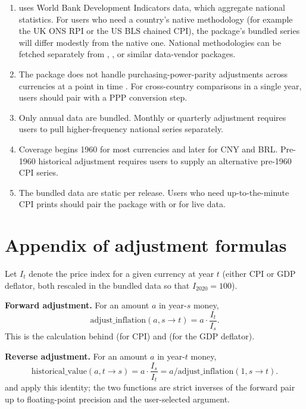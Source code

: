 \begin{enumerate}
\def\labelenumi{\arabic{enumi}.}
\tightlist
\item
   uses World Bank Development Indicators data,
  which aggregate national statistics. For users who need a
  country's native methodology (for example the UK ONS RPI or
  the US BLS chained CPI), the package's bundled series will
  differ modestly from the native one. National methodologies
  can be fetched separately from , ,
  or similar data-vendor packages.
\item
  The package does not handle purchasing-power-parity
  adjustments across currencies at a point in time
  \citep{deaton2010price}. For cross-country comparisons in a single
  year, users should pair  with a PPP
  conversion step.
\item
  Only annual data are bundled. Monthly or quarterly adjustment
  requires users to pull higher-frequency national series
  separately.
\item
  Coverage begins 1960 for most currencies and later for CNY
  and BRL. Pre-1960 historical adjustment requires users to
  supply an alternative pre-1960 CPI series.
\item
  The bundled data are static per release. Users who need
  up-to-the-minute CPI prints should pair the package with
   or  for live data.
\end{enumerate}

\section{Appendix of adjustment formulas}\label{appendix-of-adjustment-formulas}

Let \(I_t\) denote the price index for a given currency at year \(t\)
(either CPI or GDP deflator, both rescaled in the bundled data so
that \(I_{2020} = 100\)).

\textbf{Forward adjustment.} For an amount \(a\) in year-\(s\) money,
\[\mathrm{adjust\_inflation}(a, s \to t) = a \cdot \frac{I_t}{I_s}.\]
This is the calculation behind  (for
CPI) and  (for the GDP deflator).

\textbf{Reverse adjustment.} For an amount \(a\) in year-\(t\) money,
\[\mathrm{historical\_value}(a, t \to s) = a \cdot \frac{I_s}{I_t}
  = a / \mathrm{adjust\_inflation}(1, s \to t).\]
 and  apply
this identity; the two functions are strict inverses of the
forward pair up to floating-point precision and the user-selected
 argument.

